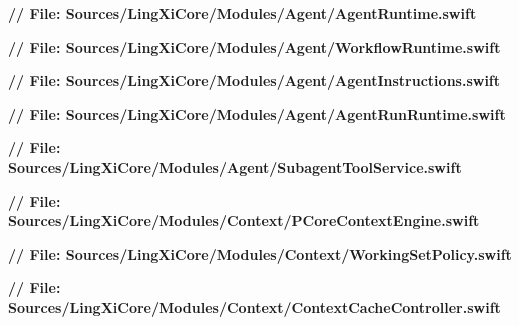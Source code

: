 \documentclass[10pt,a4paper]{article}
\newcommand{\repoRoot}{../../../}
\begin{document}
\noindent\textbf{// File: Sources/LingXiCore/Modules/Agent/AgentRuntime.swift}\par\vspace{2pt}

\vspace{8pt}

\noindent\textbf{// File: Sources/LingXiCore/Modules/Agent/WorkflowRuntime.swift}\par\vspace{2pt}

\vspace{8pt}

\noindent\textbf{// File: Sources/LingXiCore/Modules/Agent/AgentInstructions.swift}\par\vspace{2pt}

\vspace{8pt}

\noindent\textbf{// File: Sources/LingXiCore/Modules/Agent/AgentRunRuntime.swift}\par\vspace{2pt}

\vspace{8pt}

\noindent\textbf{// File: Sources/LingXiCore/Modules/Agent/SubagentToolService.swift}\par\vspace{2pt}

\vspace{8pt}

\noindent\textbf{// File: Sources/LingXiCore/Modules/Context/PCoreContextEngine.swift}\par\vspace{2pt}

\vspace{8pt}

\noindent\textbf{// File: Sources/LingXiCore/Modules/Context/WorkingSetPolicy.swift}\par\vspace{2pt}

\vspace{8pt}

\noindent\textbf{// File: Sources/LingXiCore/Modules/Context/ContextCacheController.swift}\par\vspace{2pt}

\vspace{8pt}
\end{document}
